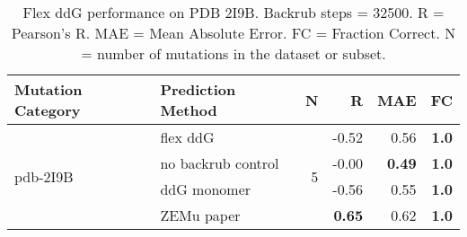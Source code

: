 \begin{table}
  \begin{tabular}{llrrrr}
\toprule
Mutation Category &   Prediction Method &  N &     R &  MAE &  FC \\
\midrule
 \multirow{ 4}{*}{pdb-2I9B} & flex ddG & \multirow{ 4}{*}{5} & -0.52 & 0.56 & \textbf{1.0}  \\
 & no backrub control & & -0.00 & \textbf{0.49} & \textbf{1.0}  \\
 & ddG monomer & & -0.56 & 0.55 & \textbf{1.0}  \\
 & ZEMu paper & & \textbf{0.65} & 0.62 & \textbf{1.0}  \\
\bottomrule
\end{tabular}
  \caption[Flex ddG performance on PDB 2I9B]{
    Flex ddG performance on PDB 2I9B. Backrub steps = 32500. R = Pearson's R. MAE = Mean Absolute Error. FC = Fraction Correct. N = number of mutations in the dataset or subset.
  } \label{tab:table-pdb-2I9B}
\end{table}
